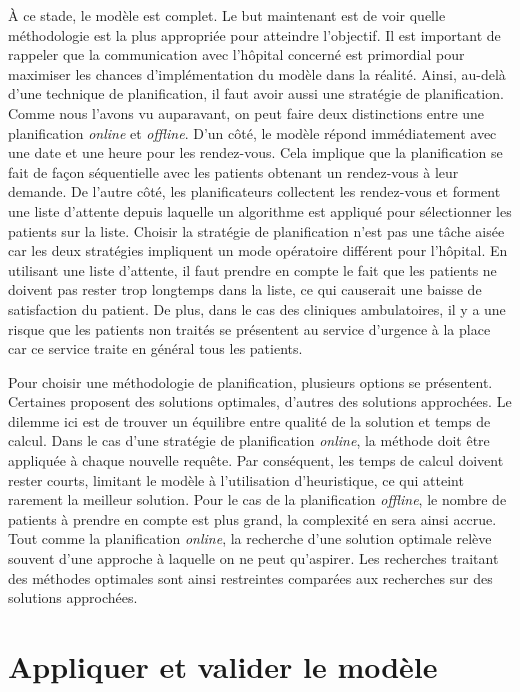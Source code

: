 \documentclass[noposter]{polytech/polytech}
\begin{document}
À ce stade, le modèle est complet. Le but maintenant est de voir quelle méthodologie est la plus appropriée pour atteindre l'objectif. Il est important de rappeler que la communication avec l'hôpital concerné est primordial pour maximiser les chances d'implémentation du modèle dans la réalité. Ainsi, au-delà d'une technique de planification, il faut avoir aussi une stratégie de planification. Comme nous l'avons vu auparavant, on peut faire deux distinctions entre une planification \textit{online} et \textit{offline}. D'un côté, le modèle répond immédiatement avec une date et une heure pour les rendez-vous. Cela implique que la planification se fait de façon séquentielle avec les patients obtenant un rendez-vous à leur demande. De l'autre côté, les planificateurs collectent les rendez-vous et forment une liste d'attente depuis laquelle un algorithme est appliqué pour sélectionner les patients sur la liste. Choisir la stratégie de planification n'est pas une tâche aisée car les deux stratégies impliquent un mode opératoire différent pour l'hôpital. En utilisant une liste d'attente, il faut prendre en compte le fait que les patients ne doivent pas rester trop longtemps dans la liste, ce qui causerait une baisse de satisfaction du patient. De plus, dans le cas des cliniques ambulatoires, il y a une risque que les patients non traités se présentent au service d'urgence à la place car ce service traite en général tous les patients.

Pour choisir une méthodologie de planification, plusieurs options se présentent. Certaines proposent des solutions optimales, d'autres des solutions approchées. Le dilemme ici est de trouver un équilibre entre qualité de la solution et temps de calcul. Dans le cas d'une stratégie de planification \textit{online}, la méthode doit être appliquée à chaque nouvelle requête. Par conséquent, les temps de calcul doivent rester courts, limitant le modèle à l'utilisation d'heuristique, ce qui atteint rarement la meilleur solution. Pour le cas de la planification \textit{offline}, le nombre de patients à prendre en compte est plus grand, la complexité en sera ainsi accrue. Tout comme la planification \textit{online}, la recherche d'une solution optimale relève souvent d'une approche à laquelle on ne peut qu'aspirer. Les recherches traitant des méthodes optimales sont ainsi restreintes comparées aux recherches sur des solutions approchées. 


\section{Appliquer et valider le modèle}
\end{document}
